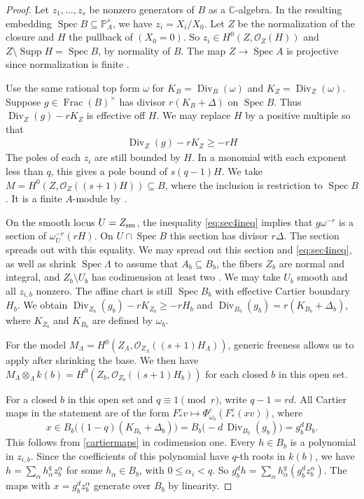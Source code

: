 \documentclass[11pt,leqno]{amsart}
\numberwithin{equation}{section}
\theoremstyle{definition}
\theoremstyle{remark}
\renewcommand{\O}{\mathcal{O}}
\newcommand{\C}{\mathbb{C}}
\newcommand{\Spec}{\operatorname{Spec}}
\newcommand{\Div}{\operatorname{Div}}
\newcommand{\Supp}{\operatorname{Supp}}
\newcommand{\stacktag}[1]{\href{https://stacks.math.columbia.edu/tag/#1}{#1}}
\DeclareMathOperator{\Frac}{Frac}
\begin{document}
\begin{proof}
Let $z_1,\ldots,z_s$ be nonzero generators of $B$ as a $\C$-algebra. In the resulting embedding $\Spec B \subseteq \mathbb{P}^s_A$, we have $z_i = X_i/X_0$. Let $Z$ be the normalization of the closure and $H$ the pullback of $(X_0 = 0)$. So $z_i \in H^0(Z,\O_Z(H))$ and $Z \setminus \Supp H = \Spec B$, by normality of $B$. The map $Z \to \Spec A$ is projective since normalization is finite \cite[\stacktag{035S}]{stacks-project}.

Use the same rational top form $\omega$ for $K_B = \Div_B(\omega)$ and $K_Z = \Div_Z(\omega)$. Suppose $g \in \Frac(B)^\times$ has divisor $r(K_B + \Delta)$ on $\Spec B$. Thus $\Div_Z(g) - rK_Z$ is effective off $H$. We may replace $H$ by a positive multiple so that \begin{align} \label{eq:sec4ineq} \Div_Z(g) - rK_Z \geq -rH \end{align} The poles of each $z_i$ are still bounded by $H$. In a monomial with each exponent less than $q$, this gives a pole bound of $s(q-1)H$. We take $M = H^0(Z,\O_Z((s+1)H)) \subseteq B$, where the inclusion is restriction to $\Spec B$. It is a finite $A$-module by \cite[\stacktag{02O6}]{stacks-project}.

On the smooth locus $U = Z_{\rm sm}$, the inequality \cref{eq:sec4ineq} implies that $g\omega^{-r}$ is a section of $\omega_U^{-r}(rH)$. On $U \cap \Spec B$ this section has divisor $r\Delta$. The section spreads out with this equality. We may spread out this section and \cref{eq:sec4ineq}, as well as shrink $\Spec\Lambda$ to assume that $A_b \subseteq B_b$, the fibers $Z_b$ are normal and integral, and $Z_b \setminus U_b$ has codimension at least two \cite[Chapter 6, Lemma 1.12 and Proposition 1.16(c), (h), (l)]{SSbook}. We may take $U_b$ smooth and all $z_{i,b}$ nonzero. The affine chart is still $\Spec B_b$ with effective Cartier boundary $H_b$. We obtain $\Div_{Z_b}(g_b)-rK_{Z_b}\geq-rH_b$ and $\Div_{B_b}(g_b)=r(K_{B_b}+\Delta_b)$, where $K_{Z_b}$ and $K_{B_b}$ are defined by $\omega_b$.

For the model $M_\Lambda=H^0(Z_\Lambda,\O_{Z_\Lambda}((s+1)H_\Lambda))$, generic freeness allows us to apply \cite[Chapter 6, Lemma 1.14]{SSbook} after shrinking the base. We then have $M_\Lambda\otimes_\Lambda k(b)=H^0(Z_b,\O_{Z_b}((s+1)H_b))$ for each closed $b$ in this open set.

For a closed $b$ in this open set and $q\equiv 1\pmod r$, write $q-1=rd$. All Cartier maps in the statement are of the form $F^e_*v\mapsto \Phi^e_{\omega_b}(F^e_*(xv))$, where
\[
 x\in B_b\bigl((1-q)(K_{B_b}+\Delta_b)\bigr)
   =B_b\bigl(-d\,\Div_{B_b}(g_b)\bigr)=g_b^d B_b.
\]
This follows from \cref{cartiermaps} in codimension one. Every $h\in B_b$ is a polynomial in $z_{i,b}$. Since the coefficients of this polynomial have $q$-th roots in $k(b)$, we have $h=\sum_\alpha h_\alpha^q z_b^\alpha$ for some $h_\alpha\in B_b$, with $0\le\alpha_i<q$. So $g_b^dh=\sum_\alpha h_\alpha^q(g_b^dz_b^\alpha)$. The maps with $x=g_b^d z_b^\alpha$ generate over $B_b$ by linearity.


\end{proof}
\end{document}
